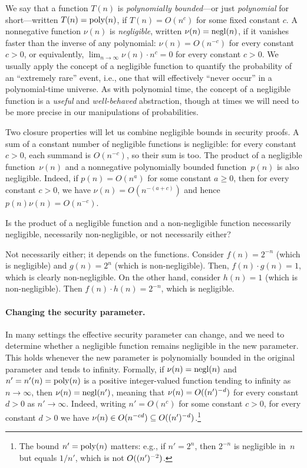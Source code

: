 \documentclass[11pt]{article}
\begin{document}
We say that a function $T(n)$ is \emph{polynomially bounded}---or just \emph{polynomial} for short---written $T(n) = \operatorname{poly}(n)$, if $T(n) = O(n^{c})$ for some fixed constant $c$.
A nonnegative function $\nu(n)$ is \emph{negligible}, written $\nu(n) = \operatorname{negl}(n)$, if it vanishes faster than the inverse of any polynomial: $\nu(n) = O(n^{-c})$ for every constant $c > 0$, or equivalently, $\lim_{n \to \infty} \nu(n) \cdot n^{c} = 0$ for every constant $c>0$.
We usually apply the concept of a negligible function to quantify the probability of an ``extremely rare'' event, i.e., one that will effectively ``never occur'' in a polynomial-time universe.
As with polynomial time, the concept of a negligible function is a \emph{useful} and \emph{well-behaved} abstraction, though at times we will need to be more precise in our manipulations of probabilities.

Two closure properties will let us combine negligible bounds in security proofs.
A sum of a constant number of negligible functions is negligible: for every constant $c>0$, each summand is $O(n^{-c})$, so their sum is too.
The product of a negligible function~$\nu(n)$ and a nonnegative polynomially bounded function~$p(n)$ is also negligible.
Indeed, if $p(n)=O(n^a)$ for some constant $a\geq0$, then for every constant $c>0$, we have $\nu(n)=O(n^{-(a+c)})$ and hence $p(n)\nu(n)=O(n^{-c})$.

\begin{question}
  Is the product of a negligible function and a non-negligible function necessarily negligible, necessarily non-negligible, or not necessarily either?
\end{question}
  
\begin{answer}
  Not necessarily either; it depends on the functions. Consider \(f(n) = 2^{-n}\)
  (which is negligible) and \(g(n) = 2^n\) (which is non-negligible).
  Then, \(f(n) \cdot g(n) = 1\), which is clearly non-negligible. On
  the other hand, consider \(h(n) = 1\) (which is
  non-negligible). Then \(f(n) \cdot h(n) = 2^{-n}\), which is
  negligible.
\end{answer}

\paragraph{Changing the security parameter.}

In many settings the effective security parameter can change, and we need to determine whether a negligible function remains negligible in the new parameter.
This holds whenever the new parameter is polynomially bounded in the original parameter and tends to infinity.
Formally, if $\nu(n)=\operatorname{negl}(n)$ and $n'=n'(n)=\operatorname{poly}(n)$ is a positive integer-valued function tending to infinity as $n\to\infty$, then $\nu(n)=\operatorname{negl}(n')$, meaning that $\nu(n)=O((n')^{-d})$ for every constant $d>0$ as $n'\to\infty$.
Indeed, writing $n'=O(n^{c})$ for some constant $c>0$, for every constant $d>0$ we have $\nu(n)\in O(n^{-cd})\subseteq O((n')^{-d})$.\footnote{The bound $n'=\operatorname{poly}(n)$ matters: e.g., if $n'=2^{n}$, then $2^{-n}$ is negligible in~$n$ but equals $1/n'$, which is not $O((n')^{-2})$.}
\end{document}
